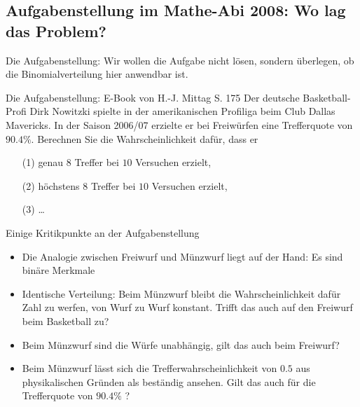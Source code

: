 \documentclass[usenames,dvipsnames,handout]{beamer}
\begin{document}
\subsection{Aufgabenstellung im Mathe-Abi 2008: Wo lag das Problem?}
\begin{frame}{Die Aufgabenstellung: }%
Wir wollen die Aufgabe nicht lösen, sondern überlegen, ob die Binomialverteilung hier anwendbar ist.\\ \pause
\begin{block}{Die Aufgabenstellung: E-Book von H.-J. Mittag S. 175}
Der deutsche Basketball-Profi Dirk Nowitzki spielte in der amerikanischen Profiliga beim Club Dallas Mavericks. In der Saison 2006/07
erzielte er bei Freiwürfen eine Trefferquote von $90.4\%.$ Berechnen Sie die Wahrscheinlichkeit dafür, dass er
\begin{itemize}
\item[(1)]{genau $8$ Treffer bei $10$ Versuchen erzielt,}
\item[(2)]{höchstens $8$ Treffer bei $10$ Versuchen erzielt,}
\item[(3)]{\dots}
\end{itemize}
\end{block}
\end{frame}

\begin{frame}{Einige Kritikpunkte an der Aufgabenstellung}
\begin{itemize}

\item{Die Analogie zwischen Freiwurf und Münzwurf liegt auf der Hand: Es sind binäre Merkmale}\pause
\item{Identische Verteilung: Beim Münzwurf bleibt die Wahrscheinlichkeit dafür Zahl zu werfen, von Wurf zu Wurf konstant. Trifft das auch
auf den Freiwurf beim Basketball zu?}\pause
\item{Beim Münzwurf sind die Würfe unabhängig, gilt das auch beim Freiwurf?}\pause
\item{Beim Münzwurf lässt sich die Trefferwahrscheinlichkeit von $0.5$ aus physikalischen Gründen als beständig ansehen.
Gilt das auch für die Trefferquote von $90.4\%$ ?}
\end{itemize}

\end{frame}
\end{document}
